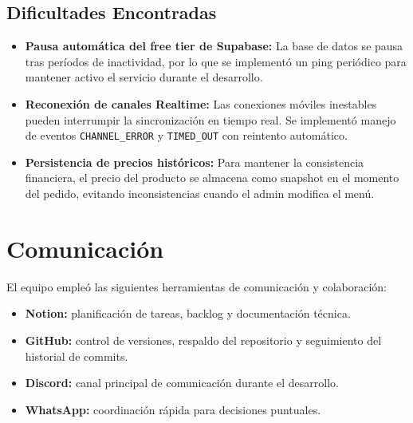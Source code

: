 \subsection{Dificultades Encontradas}

\begin{itemize}[leftmargin=1.5em]

\item \textbf{Pausa automática del free tier de Supabase:}
La base de datos se pausa tras períodos de inactividad,
por lo que se implementó un ping periódico para mantener
activo el servicio durante el desarrollo.

\item \textbf{Reconexión de canales Realtime:}
Las conexiones móviles inestables pueden interrumpir la
sincronización en tiempo real. Se implementó manejo de
eventos \texttt{CHANNEL\_ERROR} y \texttt{TIMED\_OUT}
con reintento automático.

\item \textbf{Persistencia de precios históricos:}
Para mantener la consistencia financiera, el precio del
producto se almacena como snapshot en el momento del pedido,
evitando inconsistencias cuando el admin modifica el menú.

\end{itemize}


\section{Comunicación}

El equipo empleó las siguientes herramientas de comunicación y colaboración:

\begin{itemize}[leftmargin=1.5em]
  \item \textbf{Notion:} planificación de tareas, backlog y documentación técnica.
  \item \textbf{GitHub:} control de versiones, respaldo del repositorio y seguimiento del historial de commits.
  \item \textbf{Discord:} canal principal de comunicación durante el desarrollo.
  \item \textbf{WhatsApp:} coordinación rápida para decisiones puntuales.
\end{itemize}
